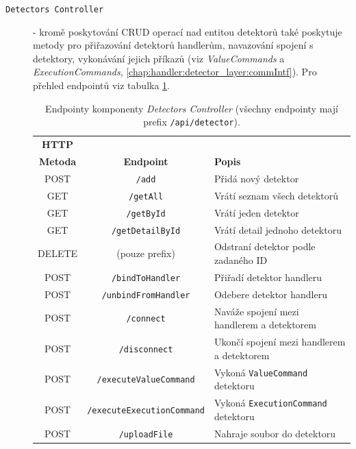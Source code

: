 \begin{description}
    \item[\texttt{Detectors Controller}] - kromě poskytování CRUD operací nad entitou detektorů také poskytuje metody pro přiřazování detektorů handlerům, navazování spojení s detektory, vykonávání jejich příkazů (viz \textit{ValueCommands} a \textit{ExecutionCommands}, \ref{chap:handler:detector_layer:commIntf}). Pro přehled endpointů viz tabulka \ref{tab:master:api_detectors}.

    \begin{table}[h!]
        \begin{center}
            \begin{tabular}{|c|c|l|}
                \hline
          \textbf{HTTP} & & \\
          \textbf{Metoda} & \textbf{Endpoint} & \textbf{Popis} \\
            \hline
            POST & \texttt{/add} & Přidá nový detektor \\
            GET & \texttt{/getAll} & Vrátí seznam všech detektorů \\
            GET & \texttt{/getById} & Vrátí jeden detektor \\
            GET & \texttt{/getDetailById} & Vrátí detail jednoho detektoru \\
            DELETE & (pouze prefix) & Odstraní detektor podle zadaného ID \\
            POST & \texttt{/bindToHandler} & Přiřadí detektor handleru \\
            POST & \texttt{/unbindFromHandler} & Odebere detektor handleru \\
            POST & \texttt{/connect} & Naváže spojení mezi handlerem a detektorem \\
            POST & \texttt{/disconnect} & Ukončí spojení mezi handlerem a detektorem \\
            POST & \texttt{/executeValueCommand} & Vykoná \texttt{ValueCommand} detektoru \\
            POST & \texttt{/executeExecutionCommand} & Vykoná \texttt{ExecutionCommand} detektoru \\
            POST & \texttt{/uploadFile} & Nahraje soubor do detektoru \\
            \hline
            \end{tabular}
        \end{center}
        \caption{Endpointy komponenty \textit{Detectors Controller} (všechny endpointy mají prefix \texttt{/api/detector}).}
        \label{tab:master:api_detectors}
    \end{table}    


\end{description}
